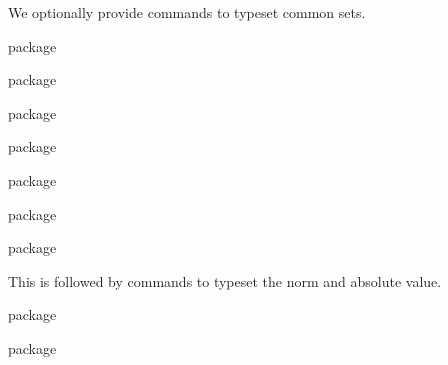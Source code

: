 \documentclass[commonsets,load]{skdoc}
\providecommand\norm\relax \providecommand\abs\relax
\providecommand\N\relax \providecommand\Z\relax
\providecommand\Q\relax \providecommand\R\relax
\providecommand\C\relax
\begin{document}
  We optionally provide commands to typeset common sets.
\begin{MacroCode}{package}
\ifskmath@commonsets
\end{MacroCode}
  \begin{macro}{\N}
\begin{MacroCode}{package}
  \NewDocumentCommand\N{}{\ensuremath{\mathbb{N}}}
\end{MacroCode}
  \end{macro}
  \begin{macro}{\Z}
\begin{MacroCode}{package}
  \NewDocumentCommand\Z{}{\ensuremath{\mathbb{Z}}}
\end{MacroCode}
  \end{macro}
  \begin{macro}{\Q}
\begin{MacroCode}{package}
  \NewDocumentCommand\Q{}{\ensuremath{\mathbb{Q}}}
\end{MacroCode}
  \end{macro}
  \begin{macro}{\R}
\begin{MacroCode}{package}
  \NewDocumentCommand\R{}{\ensuremath{\mathbb{R}}}
\end{MacroCode}
  \end{macro}
  \begin{macro}{\C}
\begin{MacroCode}{package}
  \NewDocumentCommand\C{}{\ensuremath{\mathbb{C}}}
\end{MacroCode}
  \end{macro}
\begin{MacroCode}{package}
\fi
\end{MacroCode}
 
  This is followed by commands to typeset the norm and absolute value.
  \begin{macro}{\abs}
\begin{MacroCode}{package}
\DeclarePairedDelimiter\abs{\lvert}{\rvert}
\end{MacroCode}
  \end{macro}
  \begin{macro}{\norm}
\begin{MacroCode}{package}
\DeclarePairedDelimiter\norm{\lVert}{\rVert}
\end{MacroCode}
  \end{macro}
  
\end{document}
